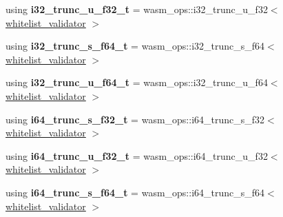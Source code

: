 \begin{DoxyCompactItemize}
using {\bfseries i32\+\_\+trunc\+\_\+u\+\_\+f32\+\_\+t} = wasm\+\_\+ops\+::i32\+\_\+trunc\+\_\+u\+\_\+f32$<$ \mbox{\hyperlink{structaacio_1_1chain_1_1wasm__validations_1_1whitelist__validator}{whitelist\+\_\+validator}} $>$
\item 
\mbox{\label{structaacio_1_1chain_1_1wasm__validations_1_1op__constrainers_af9176cf47eaf63af845465934eae5097}} 
using {\bfseries i32\+\_\+trunc\+\_\+s\+\_\+f64\+\_\+t} = wasm\+\_\+ops\+::i32\+\_\+trunc\+\_\+s\+\_\+f64$<$ \mbox{\hyperlink{structaacio_1_1chain_1_1wasm__validations_1_1whitelist__validator}{whitelist\+\_\+validator}} $>$
\item 
\mbox{\label{structaacio_1_1chain_1_1wasm__validations_1_1op__constrainers_ab5b8a61c9d786ccc5797433f513f8d32}} 
using {\bfseries i32\+\_\+trunc\+\_\+u\+\_\+f64\+\_\+t} = wasm\+\_\+ops\+::i32\+\_\+trunc\+\_\+u\+\_\+f64$<$ \mbox{\hyperlink{structaacio_1_1chain_1_1wasm__validations_1_1whitelist__validator}{whitelist\+\_\+validator}} $>$
\item 
\mbox{\label{structaacio_1_1chain_1_1wasm__validations_1_1op__constrainers_a3bc7bfe9b730d0f47e19c975a188511a}} 
using {\bfseries i64\+\_\+trunc\+\_\+s\+\_\+f32\+\_\+t} = wasm\+\_\+ops\+::i64\+\_\+trunc\+\_\+s\+\_\+f32$<$ \mbox{\hyperlink{structaacio_1_1chain_1_1wasm__validations_1_1whitelist__validator}{whitelist\+\_\+validator}} $>$
\item 
\mbox{\label{structaacio_1_1chain_1_1wasm__validations_1_1op__constrainers_adab27aa76e808f695f0adbe58ec41a8e}} 
using {\bfseries i64\+\_\+trunc\+\_\+u\+\_\+f32\+\_\+t} = wasm\+\_\+ops\+::i64\+\_\+trunc\+\_\+u\+\_\+f32$<$ \mbox{\hyperlink{structaacio_1_1chain_1_1wasm__validations_1_1whitelist__validator}{whitelist\+\_\+validator}} $>$
\item 
\mbox{\label{structaacio_1_1chain_1_1wasm__validations_1_1op__constrainers_a554e8c40d70828a852217cac1c081d52}} 
using {\bfseries i64\+\_\+trunc\+\_\+s\+\_\+f64\+\_\+t} = wasm\+\_\+ops\+::i64\+\_\+trunc\+\_\+s\+\_\+f64$<$ \mbox{\hyperlink{structaacio_1_1chain_1_1wasm__validations_1_1whitelist__validator}{whitelist\+\_\+validator}} $>$

\end{DoxyCompactItemize}
